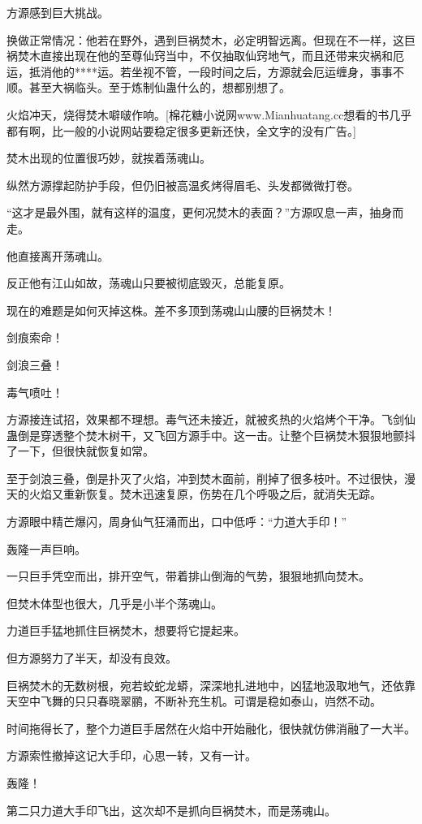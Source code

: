 \begin{this_body}
方源感到巨大挑战。

换做正常情况：他若在野外，遇到巨祸焚木，必定明智远离。但现在不一样，这巨祸焚木直接出现在他的至尊仙窍当中，不仅抽取仙窍地气，而且还带来灾祸和厄运，抵消他的****运。若坐视不管，一段时间之后，方源就会厄运缠身，事事不顺。甚至大祸临头。至于炼制仙蛊什么的，想都别想了。

火焰冲天，烧得焚木噼啵作响。[棉花糖小说网www.Mianhuatang.cc想看的书几乎都有啊，比一般的小说网站要稳定很多更新还快，全文字的没有广告。]

焚木出现的位置很巧妙，就挨着荡魂山。

纵然方源撑起防护手段，但仍旧被高温炙烤得眉毛、头发都微微打卷。

“这才是最外围，就有这样的温度，更何况焚木的表面？”方源叹息一声，抽身而走。

他直接离开荡魂山。

反正他有江山如故，荡魂山只要被彻底毁灭，总能复原。

现在的难题是如何灭掉这株。差不多顶到荡魂山山腰的巨祸焚木！

剑痕索命！

剑浪三叠！

毒气喷吐！

方源接连试招，效果都不理想。毒气还未接近，就被炙热的火焰烤个干净。飞剑仙蛊倒是穿透整个焚木树干，又飞回方源手中。这一击。让整个巨祸焚木狠狠地颤抖了一下，但很快就恢复如常。

至于剑浪三叠，倒是扑灭了火焰，冲到焚木面前，削掉了很多枝叶。不过很快，漫天的火焰又重新恢复。焚木迅速复原，伤势在几个呼吸之后，就消失无踪。

方源眼中精芒爆闪，周身仙气狂涌而出，口中低呼：“力道大手印！”

轰隆一声巨响。

一只巨手凭空而出，排开空气，带着排山倒海的气势，狠狠地抓向焚木。

但焚木体型也很大，几乎是小半个荡魂山。

力道巨手猛地抓住巨祸焚木，想要将它提起来。

但方源努力了半天，却没有良效。

巨祸焚木的无数树根，宛若蛟蛇龙蟒，深深地扎进地中，凶猛地汲取地气，还依靠天空中飞舞的只只春晓翠鹂，不断补充生机。可谓是稳如泰山，岿然不动。

时间拖得长了，整个力道巨手居然在火焰中开始融化，很快就仿佛消融了一大半。

方源索性撤掉这记大手印，心思一转，又有一计。

轰隆！

第二只力道大手印飞出，这次却不是抓向巨祸焚木，而是荡魂山。


\end{this_body}
